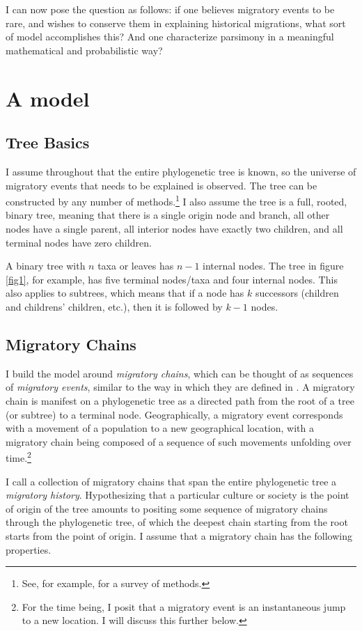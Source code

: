 \documentclass[11pt]{article}
\begin{document}
I can now pose the question as follows: if one believes migratory events to be rare, and wishes to conserve them in explaining historical migrations, what sort of model accomplishes this? And one characterize parsimony in a meaningful mathematical and probabilistic way? 

\section{A model}

\subsection{Tree Basics}

I assume throughout that the entire phylogenetic tree is known, so the universe of migratory events that needs to be explained is observed. The tree can be constructed by any number of methods.\footnote{See, for example, \citet{nichols97} for a survey of methods.  } I also assume the tree is a full, rooted, binary tree, meaning that there is a single origin node and branch, all other nodes have a single parent, all interior nodes have exactly two children, and all terminal nodes have zero children. 

A binary tree with $n$ taxa or leaves has $n-1$ internal nodes. The tree in figure \ref{fig1}, for example,  has five terminal nodes/taxa  and four internal nodes. This also applies to subtrees, which means that if a node has $k$ successors (children and childrens' children, etc.), then it is followed by $k-1$ nodes.

\subsection{Migratory Chains}
 
I build the model around \textit{migratory chains}, which can be thought of as sequences of \textit{migratory events}, similar to the way in which they are defined in \cite{dyen56}. A migratory chain is manifest on a phylogenetic tree as a directed path from the root of a tree (or subtree) to a terminal node. Geographically, a migratory event corresponds with a movement of a population to a new geographical location, with a migratory chain being composed of a sequence of such movements unfolding over time.\footnote{For the time being, I posit that a migratory event is an instantaneous jump to a new location. I will discuss this further below.}

 I call a  collection of migratory chains that span the entire phylogenetic tree a \textit{migratory history}. Hypothesizing that a particular culture or society is the point of origin of the tree amounts to positing some sequence of migratory chains through the phylogenetic tree, of which the deepest chain starting from the root starts from the point of origin. I assume that a migratory chain has the following properties.
\end{document}
